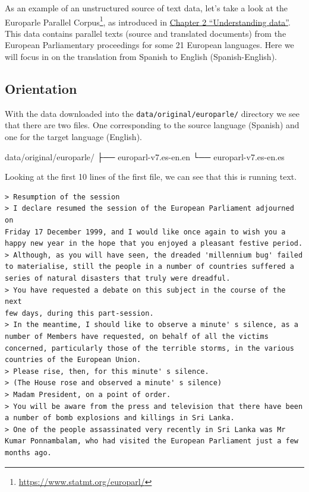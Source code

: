 \documentclass[
  letterpaper,
]{scrbook}
\newenvironment{Shaded}{\begin{snugshade}}{\end{snugshade}}
\newcommand{\ExtensionTok}[1]{\textcolor[rgb]{0.00,0.00,0.00}{#1}}
\newcommand{\NormalTok}[1]{\textcolor[rgb]{0.00,0.00,0.00}{#1}}
\DeclareRobustCommand{\href}[2]{#2\footnote{\url{#1}}}
\begin{document}
As an example of an unstructured source of text data, let's take a look
at the \href{https://www.statmt.org/europarl/}{Europarle Parallel
Corpus}, as introduced in
\protect\hyperlink{sec-understanding-data}{Chapter 2 ``Understanding
data''}. This data contains parallel texts (source and translated
documents) from the European Parliamentary proceedings for some 21
European languages. Here we will focus in on the translation from
Spanish to English (Spanish-English).

\hypertarget{orientation}{%
\subsection{Orientation}\label{orientation}}

With the data downloaded into the \texttt{data/original/europarle/}
directory we see that there are two files. One corresponding to the
source language (Spanish) and one for the target language (English).

\begin{Shaded}
\begin{Highlighting}[]
\ExtensionTok{data/original/europarle/}
\ExtensionTok{├──}\NormalTok{ europarl{-}v7.es{-}en.en}
\ExtensionTok{└──}\NormalTok{ europarl{-}v7.es{-}en.es}
\end{Highlighting}
\end{Shaded}

Looking at the first 10 lines of the first file, we can see that this is
running text.

\begin{verbatim}
> Resumption of the session
> I declare resumed the session of the European Parliament adjourned on
Friday 17 December 1999, and I would like once again to wish you a
happy new year in the hope that you enjoyed a pleasant festive period.
> Although, as you will have seen, the dreaded 'millennium bug' failed
to materialise, still the people in a number of countries suffered a
series of natural disasters that truly were dreadful.
> You have requested a debate on this subject in the course of the next
few days, during this part-session.
> In the meantime, I should like to observe a minute' s silence, as a
number of Members have requested, on behalf of all the victims
concerned, particularly those of the terrible storms, in the various
countries of the European Union.
> Please rise, then, for this minute' s silence.
> (The House rose and observed a minute' s silence)
> Madam President, on a point of order.
> You will be aware from the press and television that there have been
a number of bomb explosions and killings in Sri Lanka.
> One of the people assassinated very recently in Sri Lanka was Mr
Kumar Ponnambalam, who had visited the European Parliament just a few
months ago.
\end{verbatim}
\end{document}
